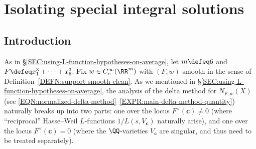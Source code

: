 \documentclass[12pt]{report}
\begin{document}




\chapter{Isolating special integral solutions}
\label{CHAP:isolating-special-solutions}

\section{Introduction}

As in \S\ref{SEC:using-L-function-hypotheses-on-average}, let $m\defeq 6$ and $F\defeq x_1^3+\dots+x_6^3$.
Fix $w\in C^\infty_c(\RR^m)$ with $(F,w)$ smooth in the sense of Definition~\ref{DEFN:support-smooth-clean}.
As we mentioned in \S\ref{SEC:using-L-function-hypotheses-on-average}, the analysis of the delta method for $N_{F,w}(X)$ (see \eqref{EQN:normalized-delta-method}--\eqref{EXPR:main-delta-method-quantity}) naturally breaks up into two parts: one over the locus $F^\vee(\bm{c})\neq 0$ (where ``reciprocal'' Hasse--Weil $L$-functions $1/L(s,V_{\bm{c}})$ naturally arise), and one over the locus $F^\vee(\bm{c})=0$ (where the $\QQ$-varieties $V_{\bm{c}}$ are singular, and thus need to be treated separately).
\end{document}
